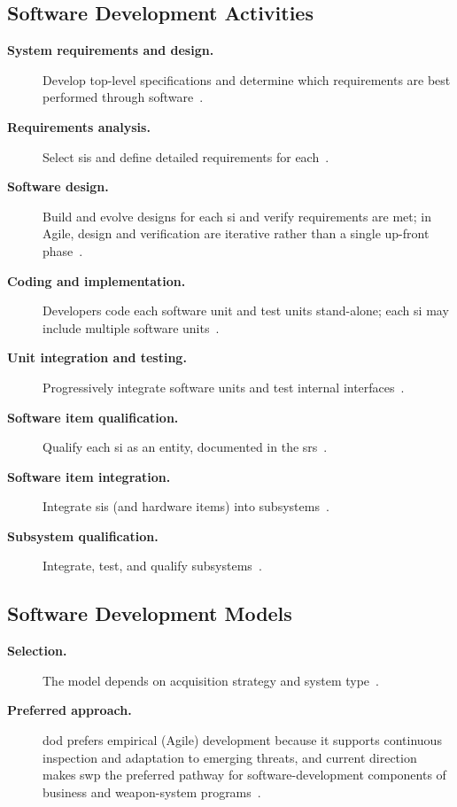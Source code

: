 \documentclass[../main.tex]{subfiles}
\begin{document}
\subsection{Software Development Activities}
\begin{description}
  \item[\textbf{System requirements and design.}] Develop top-level specifications and determine which requirements are best performed through software~\autocite{edo-3-4-2-software-acquisition-management-2025}.
  \item[\textbf{Requirements analysis.}] Select \acp{si} and define detailed requirements for each~\autocite{edo-3-4-2-software-acquisition-management-2025}.
  \item[\textbf{Software design.}] Build and evolve designs for each \ac{si} and verify requirements are met; in Agile, design and verification are iterative rather than a single up-front phase~\autocite{edo-3-4-2-software-acquisition-management-2025,DoDI5000-87}.
  \item[\textbf{Coding and implementation.}] Developers code each software unit and test units stand-alone; each \ac{si} may include multiple software units~\autocite{edo-3-4-2-software-acquisition-management-2025}.
  \item[\textbf{Unit integration and testing.}] Progressively integrate software units and test internal interfaces~\autocite{edo-3-4-2-software-acquisition-management-2025}.
  \item[\textbf{Software item qualification.}] Qualify each \ac{si} as an entity, documented in the \ac{srs}~\autocite{edo-3-4-2-software-acquisition-management-2025}.
  \item[\textbf{Software item integration.}] Integrate \acp{si} (and hardware items) into subsystems~\autocite{edo-3-4-2-software-acquisition-management-2025}.
  \item[\textbf{Subsystem qualification.}] Integrate, test, and qualify subsystems~\autocite{edo-3-4-2-software-acquisition-management-2025}.
\end{description}

\subsection{Software Development Models}
\begin{description}
  \item[\textbf{Selection.}] The model depends on acquisition strategy and system type~\autocite{edo-3-4-2-software-acquisition-management-2025}.
  \item[\textbf{Preferred approach.}] \ac{dod} prefers empirical (Agile) development because it supports continuous inspection and adaptation to emerging threats, and current direction makes \ac{swp} the preferred pathway for software-development components of business and weapon-system programs~\autocite{edo-3-4-2-software-acquisition-management-2025,DoDI5000-87,SecDef-Software-Acq-2025}.
\end{description}
\end{document}
